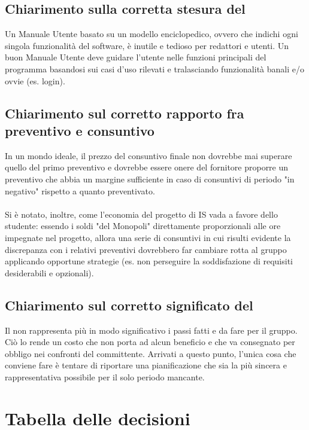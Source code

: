 \documentclass[]{article}
\begin{document}
       \subsection{Chiarimento sulla corretta stesura del }
       Un Manuale Utente basato su un modello enciclopedico, ovvero che indichi ogni singola funzionalità del software, è inutile e tedioso per redattori e utenti. Un buon Manuale Utente deve guidare l'utente nelle funzioni principali del programma basandosi sui casi d'uso rilevati e tralasciando funzionalità banali e/o ovvie (es. login).

       \subsection{Chiarimento sul corretto rapporto fra preventivo e consuntivo}
       In un mondo ideale, il prezzo del consuntivo finale non dovrebbe mai superare quello del primo preventivo e dovrebbe essere onere del fornitore proporre un preventivo che abbia un margine sufficiente in caso di consuntivi di periodo "in negativo" rispetto a quanto preventivato.
       \\\\
       Si è notato, inoltre, come l'economia del progetto di IS vada a favore dello studente: essendo i soldi "del Monopoli" direttamente proporzionali alle ore impegnate nel progetto, allora una serie di consuntivi in cui risulti evidente la discrepanza con i relativi preventivi dovrebbero far cambiare rotta al gruppo applicando opportune strategie (es. non perseguire la soddisfazione di requisiti desiderabili e opzionali).

       \subsection{Chiarimento sul corretto significato del }
       Il  non rappresenta più in modo significativo i passi fatti e da fare per il gruppo. Ciò lo rende un costo che non porta ad alcun beneficio e che va consegnato per obbligo nei confronti del committente. Arrivati a questo punto, l'unica cosa che conviene fare è tentare di riportare una pianificazione che sia la più sincera e rappresentativa possibile per il solo periodo mancante.

	\newpage

	\section{Tabella delle decisioni}
\end{document}
